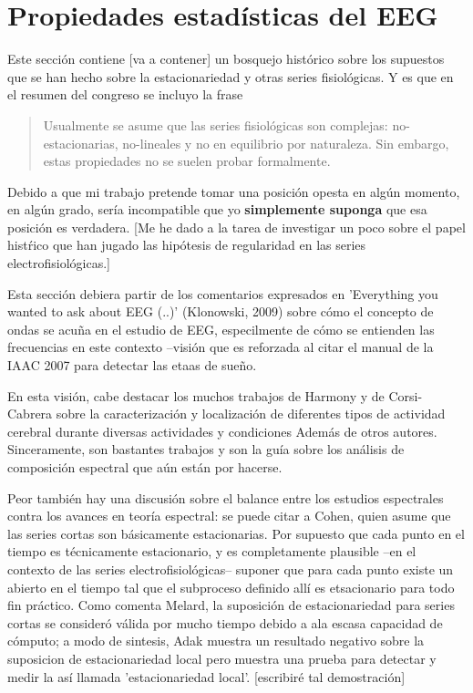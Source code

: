 
\chapter{Propiedades estad\'isticas del EEG}

Este secci\'on contiene [va a contener] un bosquejo hist\'orico sobre los supuestos que se
han hecho sobre la estacionariedad y otras series fisiol\'ogicas. Y es que en el resumen del
congreso se incluyo la frase 

\begin{quotation}
Usualmente se asume que las series fisiol\'ogicas son complejas:
no-estacionarias, no-lineales y no en equilibrio por naturaleza. Sin embargo, estas propiedades
no se suelen probar formalmente.
\end{quotation}

Debido a que mi trabajo pretende tomar una posici\'on opesta en alg\'un momento, en alg\'un grado,
ser\'ia incompatible que yo \textbf{simplemente suponga} que esa posici\'on es verdadera.
[Me he dado a la tarea de investigar un poco sobre el papel hist\'rico que han jugado las
hip\'otesis de regularidad en las series electrofisiol\'ogicas.]

Esta secci\'on debiera partir de los comentarios expresados 
en 'Everything you wanted to ask about EEG (..)'
(Klonowski, 2009) sobre c\'omo el concepto de ondas se acu\~na en el estudio de EEG, especilmente
de c\'omo se entienden las frecuencias en este contexto --visi\'on que es reforzada al citar
el manual de la IAAC 2007 para detectar las etaas de sue\~no.

En esta visi\'on, cabe destacar los muchos trabajos de Harmony y de Corsi-Cabrera
sobre la caracterizaci\'on y localizaci\'on de diferentes tipos de actividad cerebral 
durante diversas actividades y condiciones Adem\'as de otros autores. 
Sinceramente, son bastantes trabajos y
son la gu\'ia sobre los an\'alisis de composici\'on espectral que a\'un est\'an por hacerse.

Peor tambi\'en hay una discusi\'on sobre el balance entre los estudios espectrales contra
los avances en teor\'ia espectral: se puede citar a Cohen, quien asume que las series
cortas son b\'asicamente estacionarias. Por supuesto que cada punto en el tiempo es
t\'ecnicamente estacionario, y es completamente plausible --en el contexto de las series
electrofisiol\'ogicas-- suponer que para cada punto existe un abierto
en el tiempo tal que el subproceso definido all\'i es etsacionario para todo fin pr\'actico.
Como comenta Melard, la suposici\'on de estacionariedad para series cortas se 
consider\'o v\'alida por mucho tiempo debido a ala escasa capacidad de c\'omputo; a
modo de sintesis, Adak muestra un resultado negativo sobre la suposicion de estacionariedad
local pero muestra una prueba para detectar y medir la as\'i llamada 'estacionariedad local'.
[escribir\'e tal demostraci\'on]

